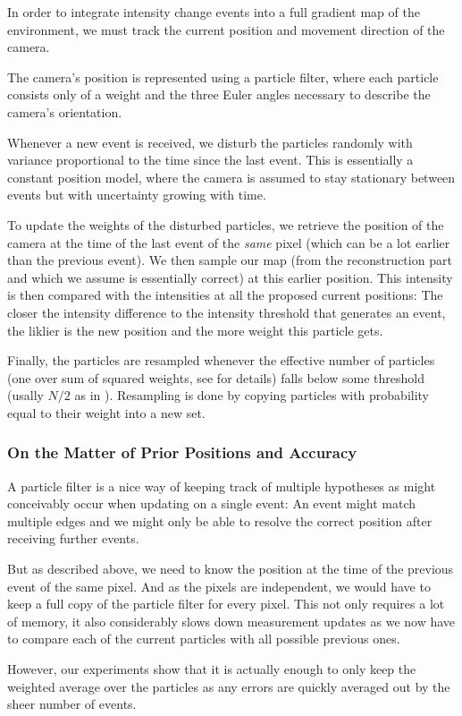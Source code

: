 In order to integrate intensity change events into a full gradient map of the
environment, we must track the current position and movement direction of the
camera.

The camera's position is represented using a particle filter, where each
particle consists only of a weight and the three Euler angles necessary to
describe the camera's orientation.

Whenever a new event is received, we disturb the particles randomly with
variance proportional to the time since the last event. This is essentially a
constant position model, where the camera is assumed to stay stationary between
events but with uncertainty growing with time.

To update the weights of the disturbed particles, we retrieve the position of
the camera at the time of the last event of the \textit{same} pixel (which can be a
lot earlier than the previous event). We then sample our map (from the
reconstruction part and which we assume is essentially correct) at this earlier
position. This intensity is then compared with the intensities at all the
proposed current positions: The closer the intensity difference to the
intensity threshold that generates an event, the liklier is the new position
and the more weight this particle gets.

Finally, the particles are resampled whenever the effective number of particles
(one over sum of squared weights, see \cite{kim2014simultaneous} for details)
falls below some threshold (usally $N/2$ as in \cite{kim2014simultaneous}).
Resampling is done by copying particles with probability equal to their weight
into a new set.

\subsubsection{On the Matter of Prior Positions and Accuracy}

A particle filter is a nice way of keeping track of multiple hypotheses as
might conceivably occur when updating on a single event: An event might match
multiple edges and we might only be able to resolve the correct position after
receiving further events.

But as described above, we need to know the position at the time of the
previous event of the same pixel. And as the pixels are independent, we would
have to keep a full copy of the particle filter for every pixel. This not only
requires a lot of memory, it also considerably slows down measurement updates
as we now have to compare each of the current particles with all possible
previous ones.

However, our experiments show that it is actually enough to only keep the
weighted average over the particles as any errors are quickly averaged out by
the sheer number of events.

